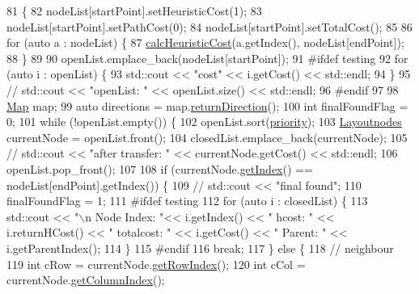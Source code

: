 \begin{DoxyCode}
81                     \{
82     nodeList[startPoint].setHeuristicCost(1);
83     nodeList[startPoint].setPathCost(0);
84     nodeList[startPoint].setTotalCost();
85 
86     \textcolor{keywordflow}{for} (\textcolor{keyword}{auto} a : nodeList) \{
87         \hyperlink{classAstar_a9963e9a8ba32f78b01d35b8d9cfc6900}{calcHeuristicCost}(a.getIndex(), nodeList[endPoint]);
88     \}
89 
90     openList.emplace\_back(nodeList[startPoint]);
91 \textcolor{preprocessor}{    #ifdef testing}
92     \textcolor{keywordflow}{for} (\textcolor{keyword}{auto} i : openList) \{
93         std::cout << \textcolor{stringliteral}{"cost"} << i.getCost() << std::endl;
94     \}
95     \textcolor{comment}{// std::cout << "openList: " << openList.size() << std::endl;}
96 \textcolor{preprocessor}{    #endif}
97 
98     \hyperlink{classMap}{Map} map;
99     \textcolor{keyword}{auto} directions = map.\hyperlink{classMap_ae6a1a1f128a7d640c10be63e4308d86d}{returnDirection}();
100     \textcolor{keywordtype}{int} finalFoundFlag = 0;
101     \textcolor{keywordflow}{while} (!openList.empty()) \{
102         openList.sort(\hyperlink{Astar_8cpp_ac4a455b1281148c8ddc3f99087c1d296}{priority});
103         \hyperlink{classLayoutnodes}{Layoutnodes} currentNode = openList.front();
104         closedList.emplace\_back(currentNode);
105         \textcolor{comment}{// std::cout << "after transfer: " << currentNode.getCost() << std::endl;}
106         openList.pop\_front();
107 
108         \textcolor{keywordflow}{if} (currentNode.\hyperlink{classLayoutnodes_ae9d58b708008c5ba3ca9cfa8d5340c25}{getIndex}() == nodeList[endPoint].getIndex()) \{
109             \textcolor{comment}{// std::cout << "final found";}
110             finalFoundFlag = 1;
111 \textcolor{preprocessor}{            #ifdef testing}
112             \textcolor{keywordflow}{for} (\textcolor{keyword}{auto} i : closedList) \{
113                 std::cout << \textcolor{stringliteral}{"\(\backslash\)n Node Index: "}<< i.getIndex() << \textcolor{stringliteral}{" hcost: "} << i.returnHCost() << \textcolor{stringliteral}{" 
       totalcost: "} << i.getCost() << \textcolor{stringliteral}{" Parent: "} << i.getParentIndex();
114             \}
115 \textcolor{preprocessor}{            #endif}
116             \textcolor{keywordflow}{break};
117         \} \textcolor{keywordflow}{else} \{
118         \textcolor{comment}{// neighbour}
119         \textcolor{keywordtype}{int} cRow = currentNode.\hyperlink{classLayoutnodes_a4032ebcb6fb8af88214ec35e6598cfce}{getRowIndex}();
120         \textcolor{keywordtype}{int} cCol = currentNode.\hyperlink{classLayoutnodes_a290cfb6a96b0beb9e764442f2c79a535}{getColumnIndex}();

\end{DoxyCode}
